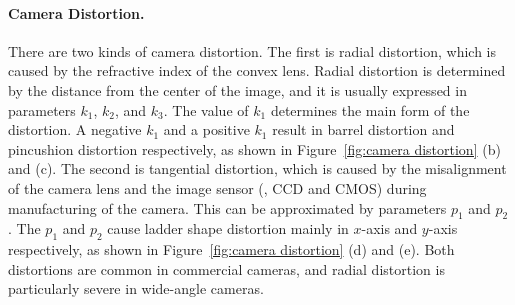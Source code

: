    \paragraph{Camera Distortion.}
        There are two kinds of camera distortion. The first is radial distortion, which is caused by the refractive index of the convex lens. Radial distortion is determined by the distance from the center of the image, and it is usually expressed in parameters $k_1$, $k_2$, and $k_3$. The value of $k_1$ determines the main form of the distortion. A negative $k_1$ and a positive $k_1$ result in barrel distortion and pincushion distortion respectively, as shown in Figure~\ref{fig:camera distortion} (b) and (c). The second is tangential distortion, which is caused by the misalignment of the camera lens and the image sensor (\eg, CCD and CMOS) during manufacturing of the camera. This can be approximated by parameters $p_1$ and $p_2$. The $p_1$ and $p_2$ cause ladder shape distortion mainly in $x$-axis and $y$-axis respectively, as shown in Figure~\ref{fig:camera distortion} (d) and (e). Both distortions are common in commercial cameras, and radial distortion is particularly severe in wide-angle cameras.

